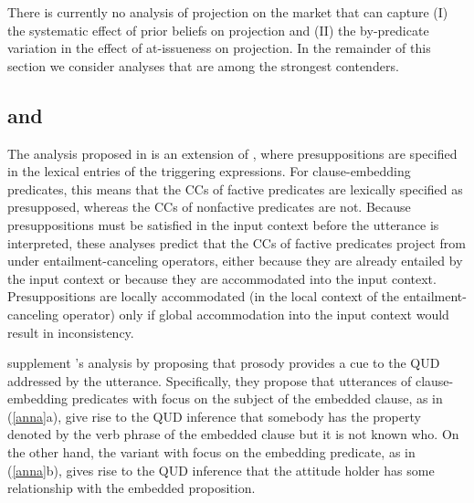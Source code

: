 \documentclass[11pt,fleqn]{article}
\newcommand{\6}{\mbox{$[\hspace*{-.6mm}[$}}
\newcommand{\9}{\mbox{$]\hspace*{-.6mm}]$}}
\newcommand{\citepos}[1]{\citeauthor{#1}'s \citeyear{#1}}
\begin{document}
There is currently no analysis of projection on the market that can capture (I) the systematic effect of prior beliefs on projection and (II) the by-predicate variation in the effect of at-issueness on projection.  In the remainder of this section we consider analyses that are among the strongest contenders. 

\subsection{\citealt{heim83} and \citealt{djaerv-bacovcin2020}}\label{s41}

The analysis proposed in \citealt{djaerv-bacovcin2020} is an extension of \citealt{heim83}, where presuppositions are specified in the lexical entries of the triggering expressions. For clause-embedding predicates, this means that the CCs of factive predicates are lexically specified as presupposed, whereas the CCs of nonfactive predicates are not. Because presuppositions must be satisfied in the input context before the utterance is interpreted, these analyses predict that the CCs of factive predicates project from under entailment-canceling operators, either because they are already entailed by the input context or because they are accommodated into the input context. Presuppositions are locally accommodated (in the local context of the entailment-canceling operator) only if global accommodation into the input context would result in inconsistency.

\citealt{djaerv-bacovcin2020} supplement \citepos{heim83} analysis by proposing that prosody provides a cue to the QUD addressed by the utterance. Specifically, they propose that utterances of clause-embedding predicates with focus on the subject of the embedded clause, as in (\ref{anna}a), give rise to the QUD inference that somebody has the property denoted by the verb phrase of the embedded clause but it is not known who. On the other hand, the variant with focus on the embedding predicate, as in (\ref{anna}b), gives rise to the QUD inference that the attitude holder has some relationship with the embedded proposition.
\end{document}
